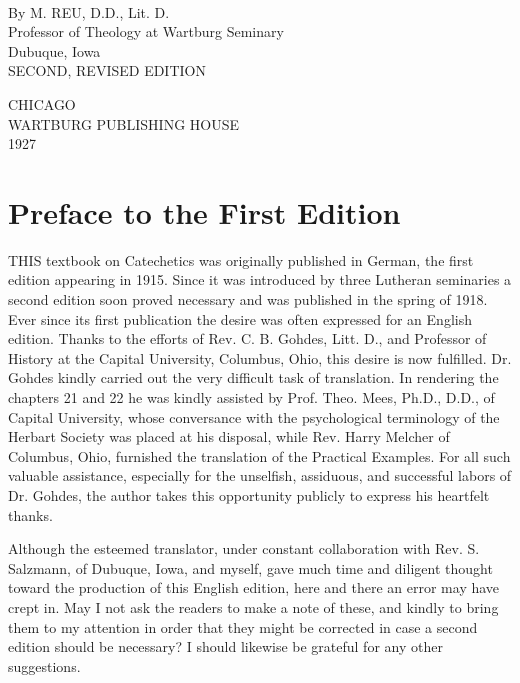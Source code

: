 \begin{titelseite}

\end{titelseite}
\begin{titelseite}

\\[1.5em]

By M. REU, D.D., Lit. D.\\
Professor of Theology at Wartburg Seminary\\
Dubuque, Iowa\\[1.5em]
SECOND, REVISED EDITION

CHICAGO\\
WARTBURG PUBLISHING HOUSE\\
1927
\end{titelseite}

\chapter{Preface to the First Edition}
THIS textbook on Catechetics was originally published in German, the first edition appearing in 1915. Since it was introduced by three Lutheran seminaries a second edition soon proved necessary and was published in the spring of 1918. Ever since its first publication the desire was often expressed for an English edition. Thanks to the efforts of Rev. C. B. Gohdes, Litt. D., and Professor of History at the Capital University, Columbus, Ohio, this desire is now fulfilled. Dr. Gohdes kindly carried out the very difficult task of translation. In rendering the chapters 21 and 22 he was kindly assisted by Prof. Theo. Mees, Ph.D., D.D., of Capital University, whose conversance with the psychological terminology of the Herbart Society was placed at his disposal, while Rev. Harry Melcher of Columbus, Ohio, furnished the translation of the Practical Examples. For all such valuable assistance, especially for the unselfish, assiduous, and successful labors of Dr. Gohdes, the author takes this opportunity publicly to express his heartfelt thanks.

Although the esteemed translator, under constant collaboration with Rev. S. Salzmann, of Dubuque, Iowa, and myself, gave much time and diligent thought toward the production of this English edition, here and there an error may have crept in. May I not ask the readers to make a note of these, and kindly to bring them to my attention in order that they might be corrected in case a second edition should be necessary? I should likewise be grateful for any other suggestions.

